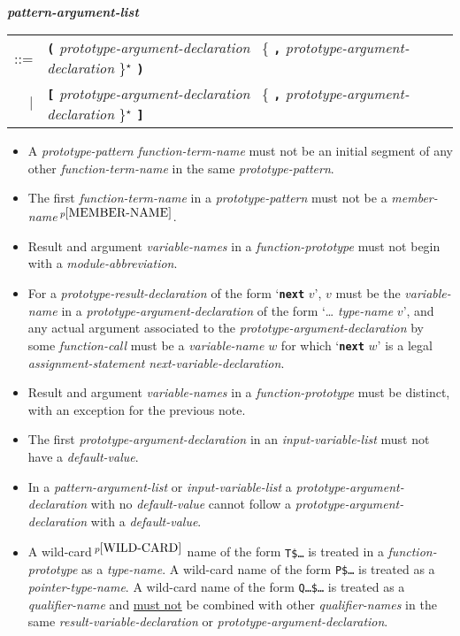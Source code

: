 \documentclass[12pt]{article}
\newcommand{\TT}[1]{{\tt \bfseries #1}}
\newcommand{\STAR}{{\Large $^\star$}}
\newcommand{\emkey}[1]{{\em \bfseries #1}}
\newcommand{\pagnote}[1]{$\,^{p\pageref{#1}}$}
\newenvironment{indpar}[1][0.3in]%
	{\begin{list}{}%
		     {\setlength{\itemsep}{0in}%
		      \setlength{\topsep}{0in}%
		      \setlength{\parsep}{1ex}%
		      \setlength{\labelwidth}{#1}%
		      \setlength{\leftmargin}{#1}%
		      \addtolength{\leftmargin}{\labelsep}}%
	 \item}%
	{\end{list}}
\begin{document}
\begin{indpar}[0.1in]
\begin{tabular}[t]{@{}p{5in}@{}}
    \end{tabular}
\\[0.5ex]
\emkey{pattern-argument-list}\label{PATTERN-ARGUMENT-LIST} \\
\hspace*{0.5in}
    \begin{tabular}[t]{@{}rl}
    ::= & \TT{(} {\em prototype-argument-declaration}~
	     \{ \TT{,} {\em prototype-argument-declaration} \}\STAR{} \TT{)} \\
    $|$ & \TT{[} {\em prototype-argument-declaration}~
	     \{ \TT{,} {\em prototype-argument-declaration} \}\STAR{} \TT{]} \\
    \end{tabular}
\begin{itemize}\label{FUNCTION-DECLARATION-RULES}
\item
A {\em prototype-pattern} {\em function-term-name} must not be
an initial segment of any other {\em function-term-name}
in the same {\em prototype-pattern}.
\item
The first {\em function-term-name} in a {\em prototype-pattern}
must not be a {\em member-name}\pagnote{MEMBER-NAME}.
\item
Result and argument {\em variable-names}
in a {\em function-prototype} must not begin with a {\em module-abbreviation}.
\item
\label{PROTOTYPE-NEXT-RESULT}
For a {\em prototype-result-declaration} of the form `\TT{next} $v$',
$v$ must be the {\em vari\-able-name} in a {\em prototype-argument-declaration}
of the form `\dots{} {\em type-name} $v$', and
any actual argument associated to the {\em prototype-argument-declaration}
by some {\em function-call}
must be a {\em variable-name} $w$ for which `\TT{next} $w$' is a legal
{\em assignment-statement} {\em next-variable-declaration}.
\item
Result and argument {\em variable-names}
in a {\em function-prototype} must
be distinct, with an exception for the previous note.
\item
The first {\em prototype-argument-declaration} in an {\em input-variable-list}
must not have a {\em default-value}.
\item
In a {\em pattern-argument-list} or {\em input-variable-list}
a {\em prototype-argument-declaration} with no {\em de\-fault-value} cannot
follow a {\em prototype-argument-declaration} with a {\em default-value}.
\item
A wild-card\pagnote{WILD-CARD} name of the form {\tt T\$\ldots}
is treated in a {\em function-prototype} as a {\em type-name}.
A wild-card name of the form {\tt P\$\ldots} is treated as a
{\em pointer-type-name}.
A wild-card name of the form {\tt Q\ldots\$\ldots} is treated as a
{\em qualifier-name} and \underline{must not} be combined with
other {\em qualifier-names} in the same {\em result-variable-declaration}
or {\em prototype-argument-declaration}.

\end{itemize}
\end{indpar}
\end{document}
